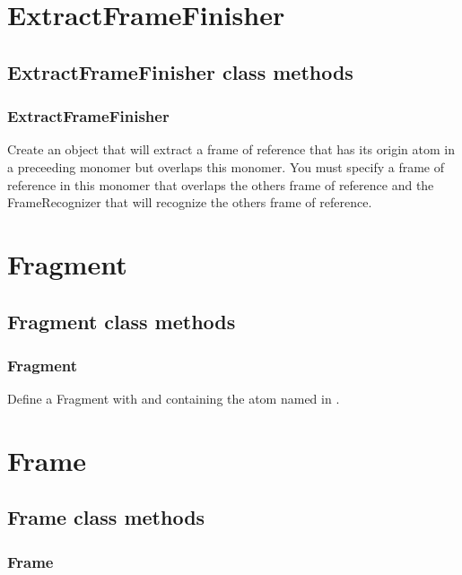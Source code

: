 \begin{itemize}
\section{ExtractFrameFinisher}
\subsection{ExtractFrameFinisher class methods}
\subsubsection{ExtractFrameFinisher}


Create an object that will extract a frame of reference that has its
origin atom in a preceeding monomer but overlaps this monomer.  
You must specify a frame of reference in this monomer  that overlaps the
others frame of reference and the FrameRecognizer that will recognize the others frame
of reference.

\section{Fragment}
\subsection{Fragment class methods}
\subsubsection{Fragment}

Define a Fragment with  and containing the atom named in .


\section{Frame}
\subsection{Frame class methods}
\subsubsection{Frame}


\end{itemize}
